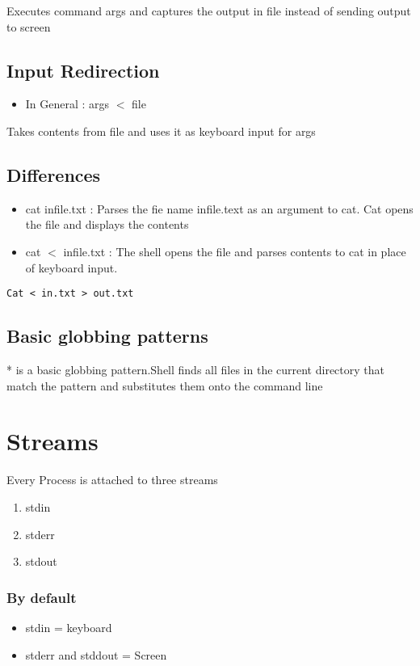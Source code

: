 \documentclass{article}
\newenvironment{ablock}[1]{%
    \tcolorbox[beamer,%
    noparskip,breakable,
    colback=lightcoral,colframe=darkred,%
    colbacklower=tomato!75!lightcoral,%
    title=#1]}%
    {\endtcolorbox}
\begin{document}
Executes command args and captures the output in file instead of sending output to screen

\subsection{Input Redirection}

\begin{itemize}
\item In General : args \(<\) file
\end{itemize}

Takes contents from file and uses it as keyboard input for args

\subsection{Differences}
\begin{itemize}
\item cat infile.txt : Parses the fie name infile.text as an argument to cat. Cat opens the file and displays the contents
\item cat \(<\) infile.txt : The shell opens the file and parses contents to cat in place of keyboard input. 
\end{itemize}

\begin{ablock}{You can do both}
\verb|Cat < in.txt > out.txt|
\end{ablock}

\subsection{Basic globbing patterns}
* is a basic globbing pattern.Shell finds all files in the current directory that match the pattern and substitutes them onto the command line

\section{Streams}
Every Process is attached to three streams 
\begin{enumerate}
\item stdin
\item stderr
\item stdout
\end{enumerate}

\subsubsection{By default}
\begin{itemize}
\item stdin = keyboard
\item stderr and stddout = Screen
\end{itemize}
\end{document}
